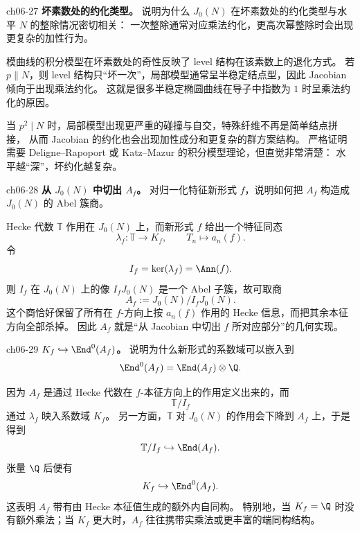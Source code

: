 \begin{problem}{ch06-27}
\textbf{坏素数处的约化类型。}
说明为什么 $J_0(N)$ 在坏素数处的约化类型与水平 $N$ 的整除情况密切相关：
一次整除通常对应乘法约化，更高次幂整除时会出现更复杂的加性行为。
\end{problem}
\begin{solution}
模曲线的积分模型在坏素数处的奇性反映了 level 结构在该素数上的退化方式。
若 $p\parallel N$，则 level 结构只“坏一次”，局部模型通常呈半稳定结点型，因此 Jacobian 倾向于出现乘法约化。
这就是很多半稳定椭圆曲线在导子中指数为 $1$ 时呈乘法约化的原因。

当 $p^2\mid N$ 时，局部模型出现更严重的碰撞与自交，特殊纤维不再是简单结点拼接，
从而 Jacobian 的约化也会出现加性成分和更复杂的群方案结构。
严格证明需要 Deligne--Rapoport 或 Katz--Mazur 的积分模型理论，但直觉非常清楚：
水平越“深”，坏约化越复杂。
\end{solution}

\begin{problem}{ch06-28}
\textbf{从 $J_0(N)$ 中切出 $A_f$。}
对归一化特征新形式 $f$，说明如何把 $A_f$ 构造成 $J_0(N)$ 的 Abel 簇商。
\end{problem}
\begin{solution}
Hecke 代数 $\mathbb T$ 作用在 $J_0(N)$ 上，而新形式 $f$ 给出一个特征同态
\[
\lambda_f:\mathbb T\to K_f,
\qquad T_n\mapsto a_n(f).
\]
令
\[
I_f=\ker(\lambda_f)=\Ann(f).
\]
则 $I_f$ 在 $J_0(N)$ 上的像 $I_fJ_0(N)$ 是一个 Abel 子簇，故可取商
\[
A_f:=J_0(N)/I_fJ_0(N).
\]
这个商恰好保留了所有在 $f$-方向上按 $a_n(f)$ 作用的 Hecke 信息，而把其余本征方向全部杀掉。
因此 $A_f$ 就是“从 Jacobian 中切出 $f$ 所对应部分”的几何实现。
\end{solution}

\begin{problem}{ch06-29}
\textbf{$K_f\hookrightarrow \End^0(A_f)$。}
说明为什么新形式的系数域可以嵌入到
\[
\End^0(A_f)=\End(A_f)\otimes \Q.
\]
\end{problem}
\begin{solution}
因为 $A_f$ 是通过 Hecke 代数在 $f$-本征方向上的作用定义出来的，而
\[
\mathbb T/I_f
\]
通过 $\lambda_f$ 映入系数域 $K_f$。
另一方面，$\mathbb T$ 对 $J_0(N)$ 的作用会下降到 $A_f$ 上，于是得到
\[
\mathbb T/I_f\hookrightarrow \End(A_f).
\]
张量 $\Q$ 后便有
\[
K_f\hookrightarrow \End^0(A_f).
\]
这表明 $A_f$ 带有由 Hecke 本征值生成的额外内自同构。
特别地，当 $K_f=\Q$ 时没有额外乘法；当 $K_f$ 更大时，$A_f$ 往往携带实乘法或更丰富的端同构结构。
\end{solution}


